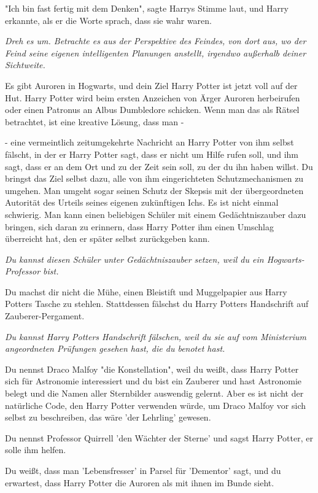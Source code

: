 {"Ich bin fast fertig mit dem Denken", sagte Harrys Stimme laut, und Harry erkannte, als er die Worte sprach, dass sie wahr waren.

\emph{Dreh es um. Betrachte es aus der Perspektive des Feindes, von dort aus, wo der Feind seine eigenen intelligenten Planungen anstellt, irgendwo außerhalb deiner Sichtweite.}

Es gibt Auroren in Hogwarts, und dein Ziel Harry Potter ist jetzt voll auf der Hut. Harry Potter wird beim ersten Anzeichen von Ärger Auroren herbeirufen oder einen Patronus an Albus Dumbledore schicken. Wenn man das als Rätsel betrachtet, ist eine kreative Lösung, dass man -

- eine vermeintlich zeitumgekehrte Nachricht an Harry Potter von ihm selbst fälscht, in der er Harry Potter sagt, dass er nicht um Hilfe rufen soll, und ihm sagt, dass er an dem Ort und zu der Zeit sein soll, zu der du ihn haben willst. Du bringst das Ziel selbst dazu, alle von ihm eingerichteten Schutzmechanismen zu umgehen. Man umgeht sogar seinen Schutz der Skepsis mit der übergeordneten Autorität des Urteils seines eigenen zukünftigen Ichs. Es ist nicht einmal schwierig. Man kann einen beliebigen Schüler mit einem Gedächtniszauber dazu bringen, sich daran zu erinnern, dass Harry Potter ihm einen Umschlag überreicht hat, den er später selbst zurückgeben kann.

\emph{\hfill\break Du kannst diesen Schüler unter Gedächtniszauber setzen, weil du ein Hogwarts-Professor bist.}

Du machst dir nicht die Mühe, einen Bleistift und Muggelpapier aus Harry Potters Tasche zu stehlen. Stattdessen fälschst du Harry Potters Handschrift auf Zauberer-Pergament.

\emph{Du kannst Harry Potters Handschrift fälschen, weil du sie auf vom Ministerium angeordneten Prüfungen gesehen hast, die du benotet hast.}

Du nennst Draco Malfoy "die Konstellation", weil du weißt, dass Harry Potter sich für Astronomie interessiert und du bist ein Zauberer und hast Astronomie belegt und die Namen aller Sternbilder auswendig gelernt. Aber es ist nicht der natürliche Code, den Harry Potter verwenden würde, um Draco Malfoy vor sich selbst zu beschreiben, das wäre 'der Lehrling' gewesen.

Du nennst Professor Quirrell 'den Wächter der Sterne' und sagst Harry Potter, er solle ihm helfen.

Du weißt, dass man 'Lebensfresser' in Parsel für 'Dementor' sagt, und du erwartest, dass Harry Potter die Auroren als mit ihnen im Bunde sieht.

}
